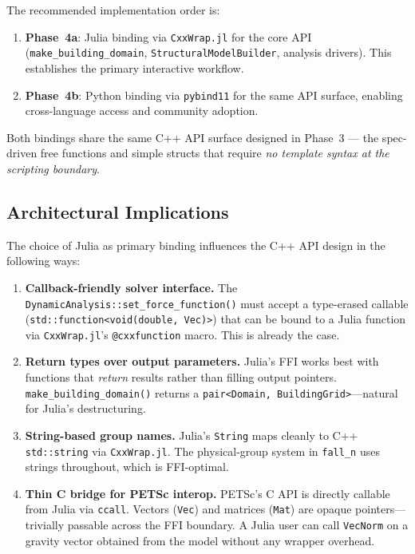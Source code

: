 The recommended implementation order is:

\begin{enumerate}
  \item \textbf{Phase~4a}: Julia binding via \texttt{CxxWrap.jl}
        for the core API (\texttt{make\_building\_domain},
        \texttt{StructuralModelBuilder}, analysis drivers).
        This establishes the primary interactive workflow.
  \item \textbf{Phase~4b}: Python binding via \texttt{pybind11}
        for the same API surface, enabling cross-language
        access and community adoption.
\end{enumerate}

Both bindings share the same C++ API surface designed in
Phase~3 --- the spec-driven free functions and simple structs
that require \emph{no template syntax at the scripting boundary}.

\subsection{Architectural Implications}
\label{sec:scripting-architecture}

The choice of Julia as primary binding influences the C++ API
design in the following ways:

\begin{enumerate}
  \item \textbf{Callback-friendly solver interface.}
        The \texttt{DynamicAnalysis::set\_force\_function()} must
        accept a type-erased callable
        (\texttt{std::function<void(double, Vec)>}) that can be
        bound to a Julia function via \texttt{CxxWrap.jl}'s
        \texttt{@cxxfunction} macro.  This is already the case.

  \item \textbf{Return types over output parameters.}
        Julia's FFI works best with functions that \emph{return}
        results rather than filling output pointers.
        \texttt{make\_building\_domain()} returns a
        \texttt{pair<Domain, BuildingGrid>}---natural for Julia's
        destructuring.

  \item \textbf{String-based group names.}
        Julia's \texttt{String} maps cleanly to C++
        \texttt{std::string} via \texttt{CxxWrap.jl}.  The
        physical-group system in \texttt{fall\_n} uses strings
        throughout, which is FFI-optimal.

  \item \textbf{Thin C bridge for PETSc interop.}
        PETSc's C API is directly callable from Julia via
        \texttt{ccall}.  Vectors (\texttt{Vec}) and matrices
        (\texttt{Mat}) are opaque pointers---trivially passable
        across the FFI boundary.  A Julia user can call
        \texttt{VecNorm} on a gravity vector obtained from the
        model without any wrapper overhead.
\end{enumerate}

